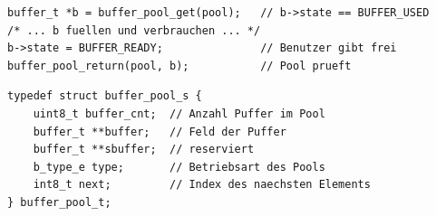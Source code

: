 \begin{listing}
\begin{verbatim}
buffer_t *b = buffer_pool_get(pool);   // b->state == BUFFER_USED
/* ... b fuellen und verbrauchen ... */
b->state = BUFFER_READY;               // Benutzer gibt frei
buffer_pool_return(pool, b);           // Pool prueft
\end{verbatim}
\caption{Lebenszyklus eines Pool-Puffers}
\label{buffer_pool_lifecycle}
\end{listing}

\begin{listing}
\begin{verbatim}
typedef struct buffer_pool_s {
    uint8_t buffer_cnt;  // Anzahl Puffer im Pool
    buffer_t **buffer;   // Feld der Puffer
    buffer_t **sbuffer;  // reserviert
    b_type_e type;       // Betriebsart des Pools
    int8_t next;         // Index des naechsten Elements
} buffer_pool_t;
\end{verbatim}
\caption{Definition der \texttt{buffer\_pool\_t} Struktur}
\label{buffer_pool_t}
\end{listing}

